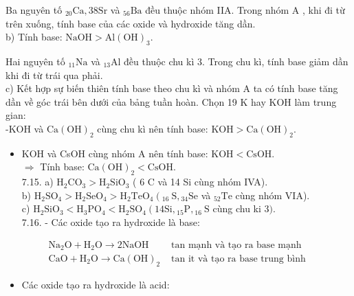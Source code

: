 \documentclass[10pt]{article}
\begin{document}
Ba nguyên tố ${ }_{20} \mathrm{Ca}, 38 \mathrm{Sr}$ và ${ }_{56} \mathrm{Ba}$ đều thuộc nhóm IIA. Trong nhóm A , khi đi từ trên xuống, tính base của các oxide và hydroxide tăng dần.\\
b) Tính base: $\mathrm{NaOH}>\mathrm{Al}(\mathrm{OH})_{3}$.

Hai nguyên tố ${ }_{11} \mathrm{Na}$ và ${ }_{13} \mathrm{Al}$ đều thuộc chu kì 3. Trong chu kì, tính base giảm dần khi đi từ trái qua phải.\\
c) Kết hợp sự biến thiên tính base theo chu kì và nhóm A ta có tính base tăng dần về góc trái bên dưới của bảng tuần hoàn. Chọn 19 K hay KOH làm trung gian:\\
-KOH và $\mathrm{Ca}(\mathrm{OH})_{2}$ cùng chu kì nên tính base: $\mathrm{KOH}>\mathrm{Ca}(\mathrm{OH})_{2}$.

\begin{itemize}
  \item KOH và CsOH cùng nhóm A nên tính base: $\mathrm{KOH}<\mathrm{CsOH}$.\\
$\Rightarrow$ Tính base: $\mathrm{Ca}(\mathrm{OH})_{2}<\mathrm{CsOH}$.\\
7.15. a) $\mathrm{H}_{2} \mathrm{CO}_{3}>\mathrm{H}_{2} \mathrm{SiO}_{3}$ ( 6 C và 14 Si cùng nhóm IVA).\\
b) $\mathrm{H}_{2} \mathrm{SO}_{4}>\mathrm{H}_{2} \mathrm{SeO}_{4}>\mathrm{H}_{2} \mathrm{TeO}_{4}\left({ }_{16} \mathrm{~S},{ }_{34} \mathrm{Se}\right.$ và ${ }_{52} \mathrm{Te}$ cùng nhóm VIA).\\
c) $\mathrm{H}_{2} \mathrm{SiO}_{3}<\mathrm{H}_{3} \mathrm{PO}_{4}<\mathrm{H}_{2} \mathrm{SO}_{4}\left(14 \mathrm{Si},{ }_{15} \mathrm{P},{ }_{16} \mathrm{~S}\right.$ cùng chu ki 3$)$.\\
7.16. - Các oxide tạo ra hydroxide là base:
\end{itemize}

$$
\begin{array}{ll}
\mathrm{Na}_{2} \mathrm{O}+\mathrm{H}_{2} \mathrm{O} \rightarrow 2 \mathrm{NaOH} & \text { tan mạnh và tạo ra base mạnh } \\
\mathrm{CaO}+\mathrm{H}_{2} \mathrm{O} \rightarrow \mathrm{Ca}(\mathrm{OH})_{2} & \text { tan it và tạo ra base trung bình }
\end{array}
$$

\begin{itemize}
  \item Các oxide tạo ra hydroxide là acid:
\end{itemize}
\end{document}
